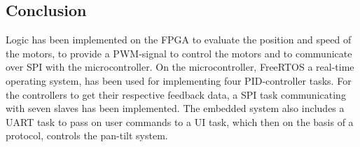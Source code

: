 \documentclass[../../main.tex]{subfiles}
\begin{document}
    





\subsection{Conclusion}

Logic has been implemented on the FPGA to evaluate the position and speed of the motors, to provide a PWM-signal to control the motors and to communicate over SPI with the microcontroller. On the microcontroller, FreeRTOS a real-time operating system, has been used for implementing four PID-controller tasks. For the controllers to get their respective feedback data, a SPI task communicating with seven slaves has been implemented.
The embedded system also includes a UART task to pass on user commands to
a UI task, which then on the basis of a protocol, controls the pan-tilt system.
\end{document}
